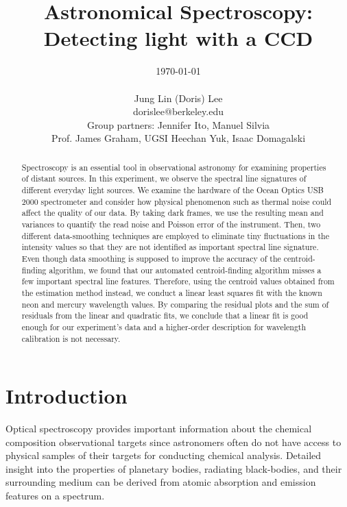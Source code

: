 \documentclass[authoryear, 12pt,5p, times]{elsarticle}
\begin{document}
\begin{frontmatter}
\title{Astronomical Spectroscopy: Detecting light with a CCD}
\author{\today \\ \quad \\Jung Lin (Doris) Lee\\ dorislee@berkeley.edu\\Group partners: Jennifer Ito, Manuel Silvia\\Prof. James Graham, UGSI Heechan Yuk, Isaac Domagalski}
	\begin{abstract}
	Spectroscopy is an essential tool in observational astronomy for examining  properties of distant sources. In this experiment, we observe the spectral line signatures of different everyday light sources. We examine the hardware of the Ocean Optics USB 2000 spectrometer and consider how physical phenomenon such as thermal noise could affect the quality of our data. %
By taking dark frames, we use the resulting mean and variances to
  quantify the read noise and Poisson error of the instrument. %
Then, two different data-smoothing techniques are employed to eliminate tiny fluctuations in the intensity values %
so that they are not identified as important spectral line signature. %
Even though data smoothing is supposed to improve the accuracy of the centroid-finding algorithm, we found that our automated centroid-finding algorithm misses a few important spectral line features. Therefore, using the centroid values obtained from the estimation method instead, we conduct a linear least squares fit with the known neon and mercury wavelength values. By comparing the residual plots and the sum of residuals from the linear and quadratic fits, we conclude that a linear fit is good enough for our experiment's data and a higher-order description for wavelength calibration is not necessary. 
  
	\end{abstract}
\end{frontmatter}
\section{Introduction\label{intro}}
Optical spectroscopy provides important information about the chemical composition observational targets since astronomers often do not have access to physical samples of their targets for conducting chemical analysis. Detailed insight into the properties of planetary bodies, radiating black-bodies, and their  surrounding medium can be derived from atomic absorption and emission features on a spectrum.
\end{document}
